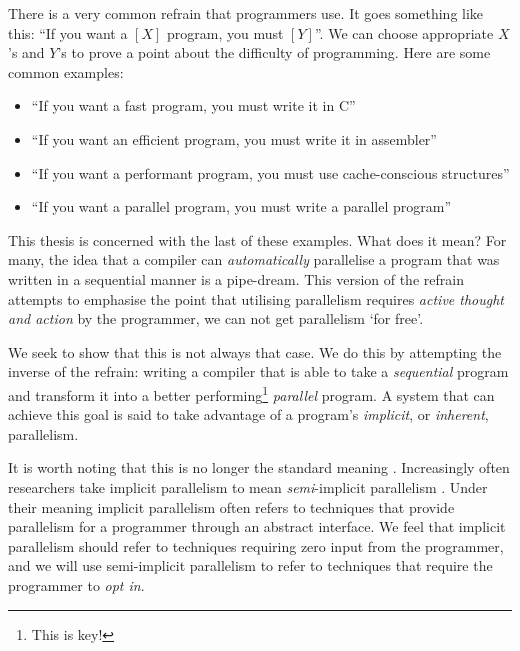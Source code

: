 There is a very common refrain that programmers use. It goes something like
this: ``If you want a $[X]$ program, you must $[Y]$''. We can choose
appropriate $X$'s and $Y$'s to prove a point about the difficulty of
programming. Here are some common examples:

\begin{itemize}
  \item ``If you want a fast program, you must write it in C''
  \item ``If you want an efficient program, you must write it in
            assembler''
  \item ``If you want a performant program, you must use
            cache-conscious structures''
  \item ``If you want a parallel program, you must write a parallel
            program''
\end{itemize}

This thesis is concerned with the last of these examples. What does it mean?
For many, the idea that a compiler can \emph{automatically} parallelise a
program that was written in a sequential manner is a pipe-dream. This version
of the refrain attempts to emphasise the point that utilising parallelism
requires \emph{active thought and action} by the programmer, we can not get
parallelism `for free'.

We seek to show that this is not always that case. We do this by attempting
the inverse of the refrain: writing a compiler that is able to take a
\emph{sequential} program and transform it into a better
performing\footnote{This is key!} \emph{parallel} program.  A system that
can achieve this goal is said to take advantage of a program's
\emph{implicit}, or \emph{inherent}, parallelism.


It is worth noting that this is no longer the standard meaning
\citep{belikov2013survey}. Increasingly often researchers take implicit
parallelism to mean \emph{semi}-implicit parallelism . Under their meaning implicit parallelism often refers
to techniques that provide parallelism for a programmer through an abstract
interface. We feel that implicit parallelism should refer to techniques
requiring zero input from the programmer, and we will use semi-implicit
parallelism to refer to techniques that require the programmer to \emph{opt
in}.
